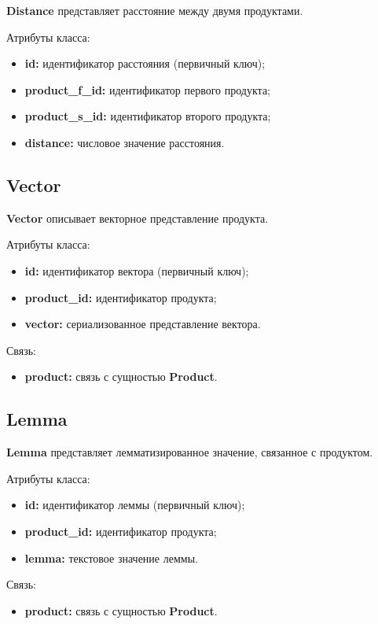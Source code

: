 \textbf{Distance} представляет расстояние между двумя продуктами.

Атрибуты класса:
\begin{itemize}
	\item \textbf{id:} идентификатор расстояния (первичный ключ);
	\item \textbf{product\_f\_id:} идентификатор первого продукта;
	\item \textbf{product\_s\_id:} идентификатор второго продукта;
	\item \textbf{distance:} числовое значение расстояния.
\end{itemize}

\subsection{Vector}

\textbf{Vector} описывает векторное представление продукта.

Атрибуты класса:
\begin{itemize}
	\item \textbf{id:} идентификатор вектора (первичный ключ);
	\item \textbf{product\_id:} идентификатор продукта;
	\item \textbf{vector:} сериализованное представление вектора.
\end{itemize}

Связь:
\begin{itemize}
	\item \textbf{product:} связь с сущностью \textbf{Product}.
\end{itemize}

\subsection{Lemma}

\textbf{Lemma} представляет лемматизированное значение, связанное с продуктом.

Атрибуты класса:
\begin{itemize}
	\item \textbf{id:} идентификатор леммы (первичный ключ);
	\item \textbf{product\_id:} идентификатор продукта;
	\item \textbf{lemma:} текстовое значение леммы.
\end{itemize}

Связь:
\begin{itemize}
	\item \textbf{product:} связь с сущностью \textbf{Product}.
\end{itemize}

